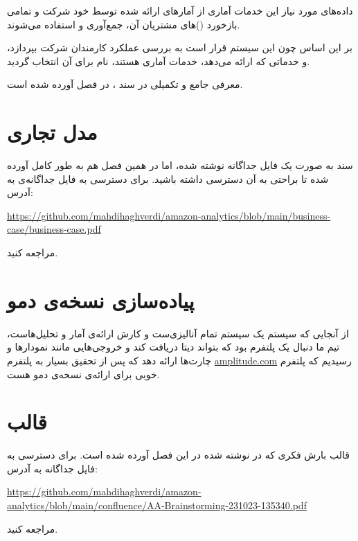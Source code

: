 \documentclass[11pt, oneside]{book}
\newcommand{\amz}{\lr{Amazon} }
\begin{document}
    داده‌های مورد نیاز این خدمات آماری از آمار‌های ارائه شده توسط خود شرکت \amz و تمامی بازخورد ()های مشتریان آن، جمع‌آوری و استفاده می‌شوند.
    
    بر این اساس چون این سیستم قرار است به بررسی عملکرد کارمندان شرکت \amz بپردازد، و خدماتی که ارائه می‌دهد، خدمات آماری هستند، نام  برای آن انتخاب گردید.
    
    معرفی جامع و تکمیلی در سند ، در فصل  آورده شده است.
    
\chapter{مدل تجاری }\label{business-case}
سند  به صورت یک فایل  جداگانه نوشته شده، اما در همین فصل هم به طور کامل آورده شده تا براحتی به آن دسترسی داشته باشید. برای دسترسی به فایل جداگانه‌ی  به آدرس:
\begin{flushleft}
    \url{https://github.com/mahdihaghverdi/amazon-analytics/blob/main/business-case/business-case.pdf}
\end{flushleft}
مراجعه کنید.



\chapter{پیاده‌سازی نسخه‌ی دمو}
از آنجایی که سیستم 
یک سیستم تمام آنالیزی‌ست و کارش ارائه‌ی آمار و تحلیل‌هاست، تیم ما دنبال یک پلتفرم بود که بتواند دیتا دریافت کند و خروجی‌هایی مانند نمودارها و چارت‌ها ارائه دهد که پس از تحقیق بسیار به پلتفرم
\url{amplitude.com}
رسیدیم که پلتفرم خوبی برای ارائه‌ی نسخه‌ی دمو هست.

\chapter{قالب }
قالب بارش فکری که در  نوشته شده در این فصل آورده شده است. برای دسترسی به فایل جداگانه به آدرس:
\begin{flushleft}
    \url{https://github.com/mahdihaghverdi/amazon-analytics/blob/main/confluence/AA-Brainstorming-231023-135340.pdf}
\end{flushleft}
مراجعه کنید.


\end{document}
